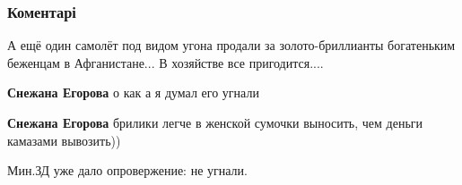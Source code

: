  
 
 
 
 
\subsubsection{Коментарі}
\label{sec:24_08_2021.fb.egorova_snezhana.6.parad_nezalezhnist.cmt}

\begin{itemize}
 
А ещё один самолёт под видом угона продали за золото-бриллианты богатеньким беженцам в Афганистане...
В хозяйстве все пригодится....

\begin{itemize}
 
\textbf{Снежана Егорова} о как а я думал его угнали

 
\textbf{Снежана Егорова} брилики легче в женской сумочки выносить, чем деньги камазами вывозить))

 
Мин.ЗД уже дало опровержение: не угнали.
\end{itemize}


\end{itemize}
